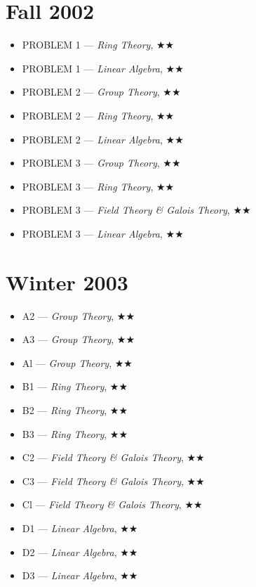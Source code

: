 \documentclass[11pt,letterpaper]{book}
\begin{document}
\section*{Fall 2002}
\begin{itemize}
\item PROBLEM 1 --- \textit{Ring Theory}, $\bigstar\bigstar$
\item PROBLEM 1 --- \textit{Linear Algebra}, $\bigstar\bigstar$
\item PROBLEM 2 --- \textit{Group Theory}, $\bigstar\bigstar$
\item PROBLEM 2 --- \textit{Ring Theory}, $\bigstar\bigstar$
\item PROBLEM 2 --- \textit{Linear Algebra}, $\bigstar\bigstar$
\item PROBLEM 3 --- \textit{Group Theory}, $\bigstar\bigstar$
\item PROBLEM 3 --- \textit{Ring Theory}, $\bigstar\bigstar$
\item PROBLEM 3 --- \textit{Field Theory \& Galois Theory}, $\bigstar\bigstar$
\item PROBLEM 3 --- \textit{Linear Algebra}, $\bigstar\bigstar$
\end{itemize}

\section*{Winter 2003}
\begin{itemize}
\item A2 --- \textit{Group Theory}, $\bigstar\bigstar$
\item A3 --- \textit{Group Theory}, $\bigstar\bigstar$
\item Al --- \textit{Group Theory}, $\bigstar\bigstar$
\item B1 --- \textit{Ring Theory}, $\bigstar\bigstar$
\item B2 --- \textit{Ring Theory}, $\bigstar\bigstar$
\item B3 --- \textit{Ring Theory}, $\bigstar\bigstar$
\item C2 --- \textit{Field Theory \& Galois Theory}, $\bigstar\bigstar$
\item C3 --- \textit{Field Theory \& Galois Theory}, $\bigstar\bigstar$
\item Cl --- \textit{Field Theory \& Galois Theory}, $\bigstar\bigstar$
\item D1 --- \textit{Linear Algebra}, $\bigstar\bigstar$
\item D2 --- \textit{Linear Algebra}, $\bigstar\bigstar$
\item D3 --- \textit{Linear Algebra}, $\bigstar\bigstar$
\end{itemize}
\end{document}
